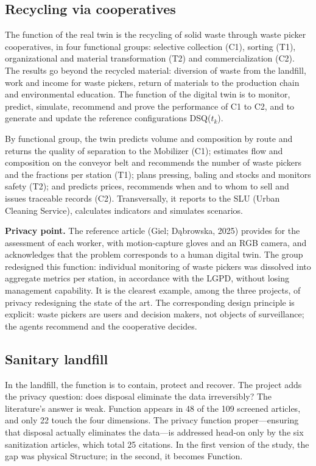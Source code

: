 \documentclass[12pt,a4paper,article,oneside,brazil,english]{abntex2}
\newcommand{\dsq}[1]{DSQ($t_{#1}$)}
\begin{document}
\subsection{Recycling via cooperatives}

The function of the real twin is the recycling of solid waste through waste picker cooperatives, in four functional groups: selective collection (C1), sorting (T1), organizational and material transformation (T2) and commercialization (C2). The results go beyond the recycled material: diversion of waste from the landfill, work and income for waste pickers, return of materials to the production chain and environmental education. The function of the digital twin is to monitor, predict, simulate, recommend and prove the performance of C1 to C2, and to generate and update the reference configurations \dsq{k}.

By functional group, the twin predicts volume and composition by route and returns the quality of separation to the Mobilizer (C1); estimates flow and composition on the conveyor belt and recommends the number of waste pickers and the fractions per station (T1); plans pressing, baling and stocks and monitors safety (T2); and predicts prices, recommends when and to whom to sell and issues traceable records (C2). Transversally, it reports to the SLU (Urban Cleaning Service), calculates indicators and simulates scenarios.

\textbf{Privacy point.} The reference article (Giel; Dąbrowska, 2025) provides for the assessment of each worker, with motion-capture gloves and an RGB camera, and acknowledges that the problem corresponds to a human digital twin. The group redesigned this function: individual monitoring of waste pickers was dissolved into aggregate metrics per station, in accordance with the LGPD, without losing management capability. It is the clearest example, among the three projects, of privacy redesigning the state of the art. The corresponding design principle is explicit: waste pickers are users and decision makers, not objects of surveillance; the agents recommend and the cooperative decides.

\subsection{Sanitary landfill}

In the landfill, the function is to contain, protect and recover. The project adds the privacy question: does disposal eliminate the data irreversibly? The literature's answer is weak. Function appears in 48 of the 109 screened articles, and only 22 touch the four dimensions. The privacy function proper---ensuring that disposal actually eliminates the data---is addressed head-on only by the six sanitization articles, which total 25 citations. In the first version of the study, the gap was physical Structure; in the second, it becomes Function.
\end{document}
